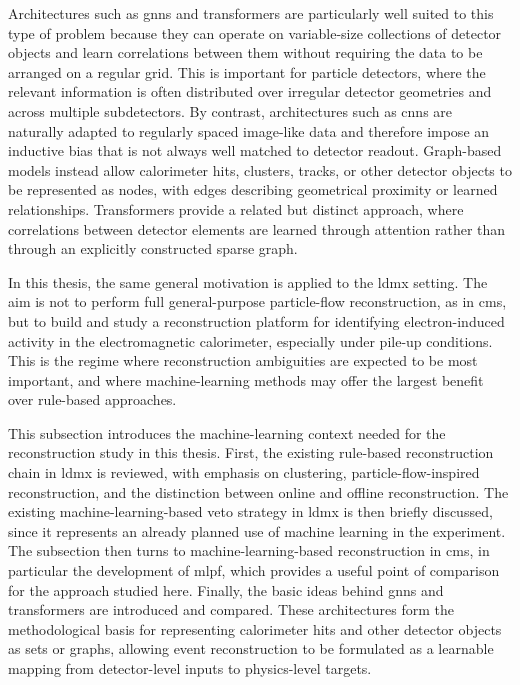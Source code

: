 Architectures such as \glspl{gnn} and transformers are particularly well suited to this type of problem because they can operate on variable-size collections of detector objects and learn correlations between them without requiring the data to be arranged on a regular grid. This is important for particle detectors, where the relevant information is often distributed over irregular detector geometries and across multiple subdetectors. By contrast, architectures such as \glspl{cnn} are naturally adapted to regularly spaced image-like data and therefore impose an inductive bias that is not always well matched to detector readout. Graph-based models instead allow calorimeter hits, clusters, tracks, or other detector objects to be represented as nodes, with edges describing geometrical proximity or learned relationships. Transformers provide a related but distinct approach, where correlations between detector elements are learned through attention rather than through an explicitly constructed sparse graph.

In this thesis, the same general motivation is applied to the \gls{ldmx} setting. The aim is not to perform full general-purpose particle-flow reconstruction, as in \gls{cms}, but to build and study a reconstruction platform for identifying electron-induced activity in the electromagnetic calorimeter, especially under pile-up conditions. This is the regime where reconstruction ambiguities are expected to be most important, and where machine-learning methods may offer the largest benefit over rule-based approaches.

This subsection introduces the machine-learning context needed for the reconstruction study in this thesis. First, the existing rule-based reconstruction chain in \gls{ldmx} is reviewed, with emphasis on clustering, particle-flow-inspired reconstruction, and the distinction between online and offline reconstruction. The existing machine-learning-based veto strategy in \gls{ldmx} is then briefly discussed, since it represents an already planned use of machine learning in the experiment. The subsection then turns to machine-learning-based reconstruction in \gls{cms}, in particular the development of \gls{mlpf}, which provides a useful point of comparison for the approach studied here. Finally, the basic ideas behind \glspl{gnn} and transformers are introduced and compared. These architectures form the methodological basis for representing calorimeter hits and other detector objects as sets or graphs, allowing event reconstruction to be formulated as a learnable mapping from detector-level inputs to physics-level targets.


